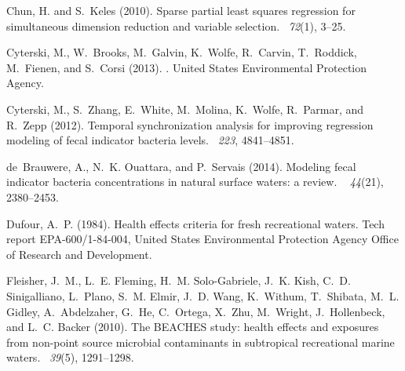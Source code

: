 \documentclass[authoryear,review, 12pt]{elsarticle}
\begin{document}
\begin{thebibliography}{}
Chun, H. and S.~Keles (2010).
\newblock Sparse partial least squares regression for simultaneous dimension
  reduction and variable selection.
~{\em 72\/}(1), 3--25.

Cyterski, M., W.~Brooks, M.~Galvin, K.~Wolfe, R.~Carvin, T.~Roddick, M.~Fienen,
  and S.~Corsi (2013).
.
\newblock United States Environmental Protection Agency.

Cyterski, M., S.~Zhang, E.~White, M.~Molina, K.~Wolfe, R.~Parmar, and R.~Zepp
  (2012).
\newblock Temporal synchronization analysis for improving regression modeling
  of fecal indicator bacteria levels.
~{\em 223}, 4841--4851.

de~Brauwere, A., N.~K. Ouattara, and P.~Servais (2014).
\newblock Modeling fecal indicator bacteria concentrations in natural surface
  waters: a review.
~{\em
  44\/}(21), 2380--2453.

Dufour, A.~P. (1984).
\newblock Health effects criteria for fresh recreational waters.
\newblock Tech report EPA-600/1-84-004, {United States Environmental Protection
  Agency Office of Research and Development}.

Fleisher, J.~M., L.~E. Fleming, H.~M. Solo-Gabriele, J.~K. Kish, C.~D.
  Sinigalliano, L.~Plano, S.~M. Elmir, J.~D. Wang, K.~Withum, T.~Shibata, M.~L.
  Gidley, A.~Abdelzaher, G.~He, C.~Ortega, X.~Zhu, M.~Wright, J.~Hollenbeck,
  and L.~C. Backer (2010).
\newblock The {BEACHES} study: health effects and exposures from non-point source
  microbial contaminants in subtropical recreational marine waters.
~{\em 39\/}(5),
  1291--1298.


\end{thebibliography}
\end{document}
